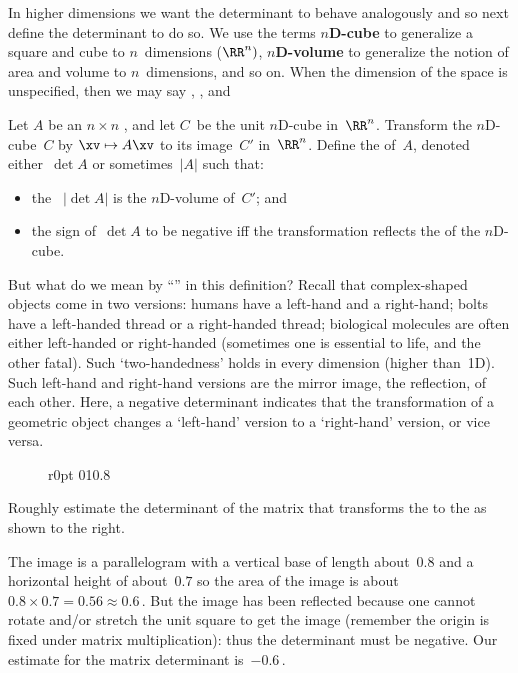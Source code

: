 In higher dimensions we want the determinant to behave analogously and so next define the determinant to do so.
We use the terms \textbf{$n$D-cube} to generalize a square and cube to \(n\)~dimensions (\(\RR^n)\), \textbf{$n$D-volume} to generalize the notion of area and volume to \(n\)~dimensions, and so on.
When the dimension of the space is unspecified, then we may say , , and 


\begin{definition} \label{def:detarea} 
Let \(A\) be an \(n\times n\) , and let \(C\)~be the unit $n$D-cube in~\(\RR^n\).
Transform the \(n\)D-cube~\(C\) by \(\xv\mapsto A\xv\)\index{$\mapsto$} to its image~\(C'\) in~\(\RR^n\). 
Define the  of~\(A\), denoted either~\(\det A\) or sometimes~\(|A|\) such that:  \begin{itemize}
\item the ~\(|\det A|\) is the $n$D-volume of~\(C'\); and 
\item the sign of~\(\det A\) to be negative iff the transformation reflects the  of the $n$D-cube.
\end{itemize}
\end{definition}

But what do we mean by ``'' in this definition?
Recall that complex-shaped objects come in two versions: humans have a left-hand and a right-hand; bolts have a left-handed thread or a right-handed thread; biological molecules are often either left-handed or right-handed (sometimes one is essential to life, and the other fatal).
Such `two-handedness' holds in every dimension (higher than~1D).
Such left-hand and right-hand versions are the mirror image, the reflection, of each other.
Here, a negative determinant indicates that the transformation of a geometric object changes a `left-hand' version to a `right-hand' version, or vice versa.

\begin{wrapfigure}r{0pt} 0{1}{0.8} \end{wrapfigure}
\begin{example} 
Roughly estimate the determinant of the matrix that transforms the  to the  as shown to the right.
\begin{solution} 
The image is a parallelogram with a vertical base of length about~\(0.8\) and a horizontal height of about~\(0.7\) so the area of the image is about~\(0.8\times0.7=0.56\approx 0.6\)\,.
But the image has been reflected because one cannot rotate and/or stretch the unit square to get the image (remember the origin is fixed under matrix multiplication): thus the determinant must be negative.
Our estimate for the matrix determinant is~\(-0.6\)\,.
\aqed

\end{solution}
\end{example}



